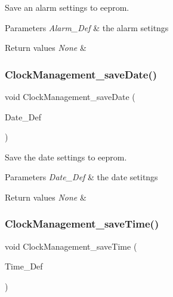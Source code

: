 Save an alarm settings to eeprom. 


\begin{DoxyParams}{Parameters}
{\em Alarm\+\_\+\+Def} & the alarm setitngs \\
\hline
\end{DoxyParams}

\begin{DoxyRetVals}{Return values}
{\em None} & \\
\hline
\end{DoxyRetVals}
\mbox{\label{group___clock___management_gaeb0fe7501d61ae2b3c76bff6813b3f92}} 
\subsubsection{\texorpdfstring{Clock\+Management\+\_\+save\+Date()}{ClockManagement\_saveDate()}}
{\footnotesize\ttfamily void Clock\+Management\+\_\+save\+Date (\begin{DoxyParamCaption}\item[{R\+T\+C\+\_\+\+Date\+Type\+Def $\ast$}]{Date\+\_\+\+Def }\end{DoxyParamCaption})}



Save the date settings to eeprom. 


\begin{DoxyParams}{Parameters}
{\em Date\+\_\+\+Def} & the date setitngs \\
\hline
\end{DoxyParams}

\begin{DoxyRetVals}{Return values}
{\em None} & \\
\hline
\end{DoxyRetVals}
\mbox{\label{group___clock___management_ga009f76700625563bf41ca2c7beceff72}} 
\subsubsection{\texorpdfstring{Clock\+Management\+\_\+save\+Time()}{ClockManagement\_saveTime()}}
{\footnotesize\ttfamily void Clock\+Management\+\_\+save\+Time (\begin{DoxyParamCaption}\item[{R\+T\+C\+\_\+\+Time\+Type\+Def $\ast$}]{Time\+\_\+\+Def }\end{DoxyParamCaption})}



